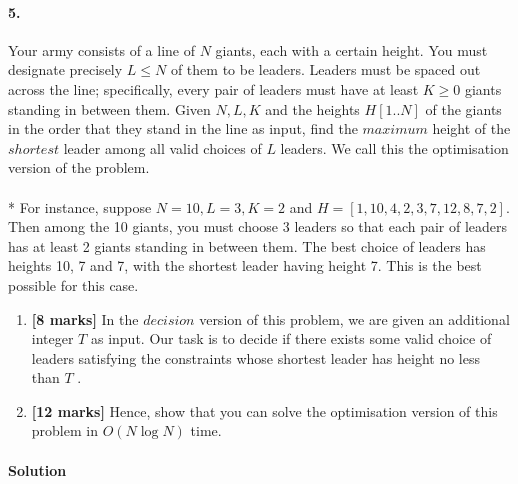\documentclass[a4paper]{scrartcl}
\begin{document}
\paragraph{5.}
\label{sec:Question 5}
Your army consists of a line of $N$ giants, each with a certain height. You must designate precisely $L \leq N$ of them to be leaders. Leaders must be spaced out across the line; specifically, every pair of leaders must have at least $K \geq 0$ giants standing in between them. Given $N,L,K$ and the heights $H[1..N]$ of the giants in the order that they stand in the line as input, find the $maximum$ height of the $shortest$ leader among all valid choices of $L$ leaders. We call this the optimisation version of the problem.\\
\\*
For instance, suppose $N = 10,L = 3,K = 2$ and $H = [1,10,4,2,3,7,12,8,7,2].$ Then among the 10 giants, you must choose 3 leaders so that each pair of leaders has at least 2 giants standing in between them. The best choice of leaders has heights 10, 7 and 7, with the shortest leader having height 7. This is the best possible for this case.
\begin{enumerate}[label=(\alph*)]
  \item {\bfseries[8 marks]} In the $decision$ version of this problem, we are given an additional integer $T$ as input. Our task is to decide if there exists some valid choice of leaders satisfying the constraints whose shortest leader has height no less than $T$ .
  \item {\bfseries[12 marks]} Hence, show that you can solve the optimisation version of this problem in $O(N\log{N})$ time.
\end{enumerate}\paragraph{Solution}
\end{document}
